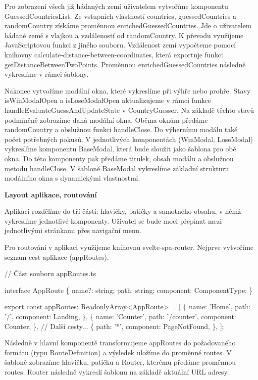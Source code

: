 Pro zobrazení všech již hádaných zemí uživatelem vytvoříme komponentu GuessedCountriesList. Ze vstupních vlastností countries, guessedCountries a randomCountry získáme proměnnou enrichedGuessedCountries. 
Jde o uživatelem hádané země s vlajkou a vzdáleností od randomCountry. K převodu využijeme JavaScriptovou funkci z jiného souboru. 
Vzdálenost zemí vypočteme pomocí knihovny calculate-distance-between-coordinates, která exportuje funkci getDistanceBetweenTwoPoints. Proměnnou enrichedGuessedCountries následně vykreslíme v rámci šablony.

Nakonec vytvoříme modální okna, které vykreslíme při výhře nebo prohře. Stavy isWinModalOpen a isLoseModalOpen aktualizujeme v rámci funkce handleEvaluateGuessAndUpdateState v CountryGuesser. 
Na základě těchto stavů podmíněně zobrazíme daná modální okna. Oběma oknům předáme randomCountry a obslužnou funkci handleClose. Do výhernímu modálu také počet potřebných pokusů. 
V jednotlivých komponentách (WinModal, LoseModal) vykreslíme komponentu BaseModal, která bude sloužit jako šablona pro obě okna. Do této komponenty pak předáme titulek, obsah modálu a obslužnou metodu handleClose. 
V šabloně BaseModal vykreslíme základní strukturu modálního okna s dynamickými vlastnostmi.

\begin{flushleft}
  \textbf{Layout aplikace, routování}
\end{flushleft}

Aplikaci rozdělíme do tří částí: hlavičky, patičky a samotného obsahu, v němž vykreslíme jednotlivé komponenty. Uživatel se bude moci přepínat mezi jednotlivými stránkami přes navigační menu. 

Pro routování v aplikaci využijeme knihovnu svelte-spa-router. Nejprve vytvoříme seznam cest aplikace (appRoutes).

\begin{prog}
// Část souboru appRoutes.ts

interface AppRoute \{
  name?: string;
  path: string;
  component: ComponentType;
\}

export const appRoutes: ReadonlyArray<AppRoute> = [
  \{
    name: 'Home',
    path: '/',
    component: Landing,
  \},
  \{
    name: 'Counter',
    path: '/counter',
    component: Counter,
  \},
  // Další cesty...
  \{
    path: '*',
    component: PageNotFound,
  \},
];
\end{prog}

Následně v hlavní komponentě transformujeme appRoutes do požadovaného formátu (typu RouteDefinition) a výsledek uložíme do proměnné routes. 
V šabloně zobrazíme hlavičku, patičku a Router, kterému předáme proměnnou routes. Router následně vykreslí šablonu na základě aktuální URL adresy.


